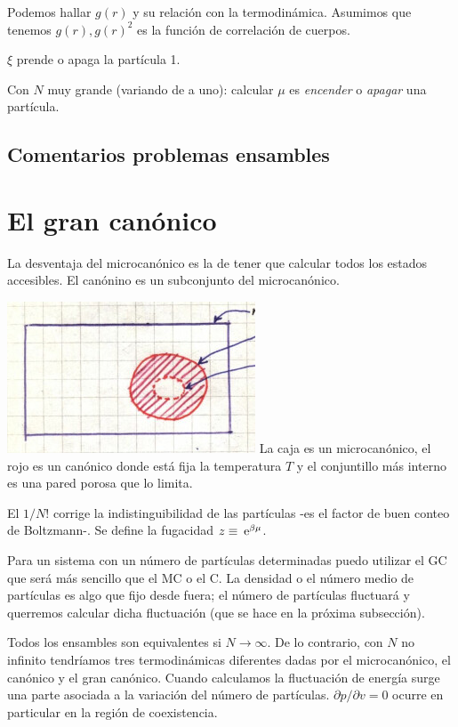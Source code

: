 \documentclass[10pt,oneside]{CBFT_book}
\begin{document}
Podemos hallar $g(r)$ y su relación con la termodinámica. Asumimos que tenemos $g(r), g(r)^2$ es la función
de correlación de cuerpos.

$\xi$ prende o apaga la partícula 1.

Con $N$ muy grande (variando de a uno): calcular $\mu$ es \textit{encender} o \textit{apagar} una partícula.

\subsection{Comentarios problemas ensambles}

\section{El gran canónico}

La desventaja del microcanónico es la de tener que calcular todos los estados accesibles.
El canónino es un subconjunto del microcanónico.

\includegraphics[scale=0.5]{images/1606329345.jpg} 
La caja es un microcanónico, el rojo es un canónico donde está fija la temperatura $T$ y el
conjuntillo más interno es una pared porosa que lo limita.

El $1/N!$ corrige la indistinguibilidad de las partículas -es el factor de buen conteo de Boltzmann-.
Se define la fugacidad $ z \equiv \:\mathrm{e}^{ \beta \mu } $.

Para un sistema con un número de partículas determinadas puedo utilizar el GC que será más sencillo
que el MC o el C. La densidad o el número medio de partículas es algo que fijo desde fuera; el número
de partículas fluctuará y querremos calcular dicha fluctuación (que se hace en la próxima
subsección).

Todos los ensambles son equivalentes si $N \to \infty$. De lo contrario, con $N$ no infinito
tendríamos tres termodinámicas diferentes dadas por el microcanónico, el canónico y el gran canónico.
Cuando calculamos la fluctuación de energía surge una parte asociada a la variación del número de
partículas. $\partial p / \partial v = 0$ ocurre en particular en la región de coexistencia.
\end{document}
